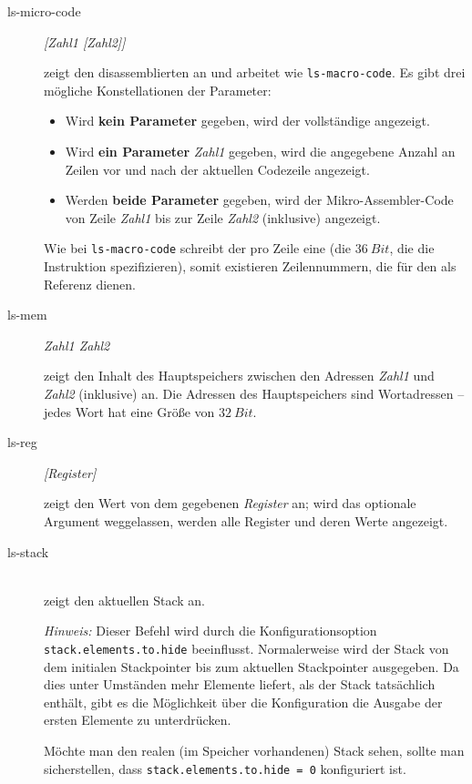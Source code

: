 \begin{description}
\item[ls-micro-code] \emph{[Zahl1 [Zahl2]]}

  zeigt den disassemblierten \mac an und arbeitet wie \texttt{ls-macro-code}. Es gibt drei mögliche Konstellationen der Parameter:
  \begin{itemize}
  \item Wird \textbf{kein Parameter} gegeben, wird der vollständige \mac angezeigt.
  \item Wird \textbf{ein Parameter} \emph{Zahl1} gegeben, wird die angegebene Anzahl an Zeilen vor und nach der aktuellen Codezeile angezeigt.
  \item Werden \textbf{beide Parameter} gegeben, wird der Mikro-Assembler-Code von Zeile \emph{Zahl1} bis zur Zeile \emph{Zahl2} (inklusive) angezeigt.
  \end{itemize}

  Wie bei \texttt{ls-macro-code} schreibt der \md pro Zeile eine \mai (die $36~Bit$, die die Instruktion spezifizieren), somit existieren Zeilennummern, die für den \md als Referenz dienen.

\item[ls-mem] \emph{Zahl1 Zahl2}

  zeigt den Inhalt des Hauptspeichers zwischen den Adressen \emph{Zahl1} und \emph{Zahl2} (inklusive) an. Die Adressen des Hauptspeichers sind Wortadressen -- jedes Wort hat eine Größe von $32~Bit$.

\item[ls-reg] \emph{[Register]}

  zeigt den Wert von dem gegebenen \emph{Register} an; wird das optionale Argument weggelassen, werden alle Register und deren Werte angezeigt.

\item[ls-stack] \hspace*{\fill}\\

  zeigt den aktuellen Stack an.

  \emph{Hinweis:} Dieser Befehl wird durch die Konfigurationsoption \texttt{stack.elements.to.hide} beeinflusst. Normalerweise wird der Stack von dem initialen Stackpointer bis zum aktuellen Stackpointer ausgegeben. Da dies unter Umständen mehr Elemente liefert, als der Stack tatsächlich enthält, gibt es die Möglichkeit über die Konfiguration die Ausgabe der ersten Elemente zu unterdrücken.

Möchte man den realen (im Speicher vorhandenen) Stack sehen, sollte man sicherstellen, dass \texttt{stack.elements.to.hide = 0} konfiguriert ist.


\end{description}
